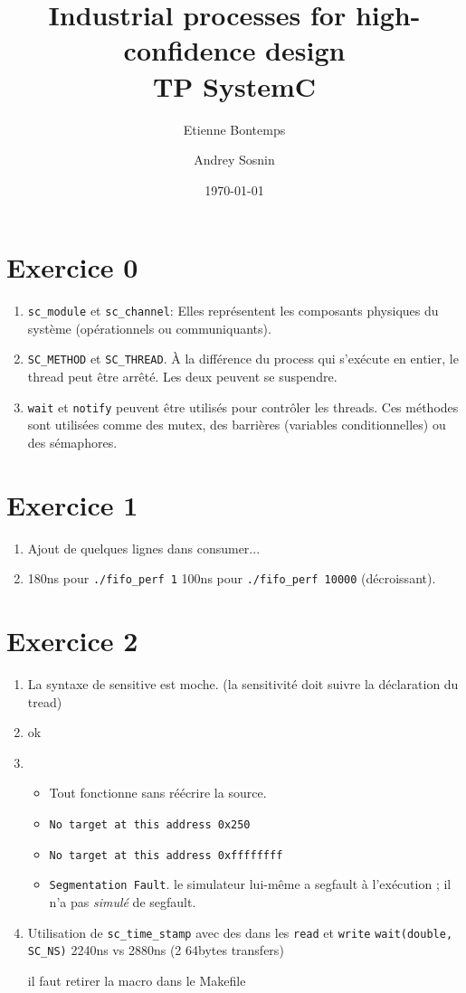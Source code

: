 \documentclass[11pt]{article}
\title{\textbf{Industrial processes for high-confidence design}\\ TP SystemC}
\date{\today}
\author{Etienne Bontemps \and Andrey Sosnin}
\begin{document}
\maketitle

\section*{Exercice 0}
\begin{enumerate}
    \item \texttt{sc\_module} et \texttt{sc\_channel}: Elles représentent les composants physiques du système (opérationnels ou communiquants).
    \item \texttt{SC\_METHOD} et \texttt{SC\_THREAD}. À la différence du process qui s'exécute en entier, le thread peut être arrêté. Les deux peuvent se suspendre.
    \item \texttt{wait} et \texttt{notify} peuvent être utilisés pour contrôler les threads. Ces méthodes sont utilisées comme des mutex, des barrières (variables conditionnelles) ou des sémaphores.
\end{enumerate}

\section*{Exercice 1}
\begin{enumerate}
    \item Ajout de quelques lignes dans consumer...
    \item 180ns pour \texttt{./fifo\_perf 1} 100ns pour \texttt{./fifo\_perf 10000} (décroissant).
\end{enumerate}

\section*{Exercice 2}
\begin{enumerate}
    \item La syntaxe de sensitive est moche. (la sensitivité doit suivre la déclaration du tread)
    \item ok
    \item   \begin{itemize}
                \item Tout fonctionne sans réécrire la source.
                \item \texttt{No target at this address 0x250}
                \item \texttt{No target at this address 0xffffffff}
                \item \texttt{Segmentation Fault}. le simulateur lui-même a segfault à l'exécution ; il n'a pas \emph{simulé} de segfault.
            \end{itemize}
    \item Utilisation de \texttt{sc\_time\_stamp} avec des dans les \texttt{read} et \texttt{write} \texttt{wait(double, SC\_NS)}
    2240ns vs 2880ns (2 64bytes transfers)

    il faut retirer la macro dans le Makefile
\end{enumerate}
\end{document}
